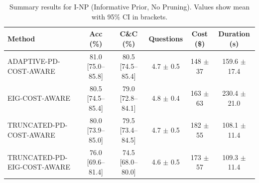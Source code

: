 \begin{table}[htbp]
\centering
\small
\caption{Summary results for I-NP (Informative Prior, No Pruning). Values show mean with 95\% CI in brackets.}
\label{tab:results-notprune_notuniform}
\begin{tabular}{@{}lccccc@{}}
\toprule
Method & Acc (\%) & C\&C (\%) & Questions & Cost (\$) & Duration (s) \\
\midrule
ADAPTIVE-PD-COST-AWARE & 81.0 [75.0--85.8] & 80.5 [74.5--85.4] & 4.7 $\pm$ 0.5 & 148 $\pm$ 37 & 159.6 $\pm$ 17.4 \\
EIG-COST-AWARE & 80.5 [74.5--85.4] & 79.0 [72.8--84.1] & 4.8 $\pm$ 0.4 & 163 $\pm$ 63 & 230.4 $\pm$ 21.0 \\
TRUNCATED-PD-COST-AWARE & 80.0 [73.9--85.0] & 79.5 [73.4--84.5] & 4.7 $\pm$ 0.5 & 182 $\pm$ 55 & 108.1 $\pm$ 11.4 \\
TRUNCATED-PD-EIG-COST-AWARE & 76.0 [69.6--81.4] & 74.5 [68.0--80.0] & 4.6 $\pm$ 0.5 & 173 $\pm$ 57 & 109.3 $\pm$ 11.4 \\
\bottomrule
\end{tabular}
\end{table}